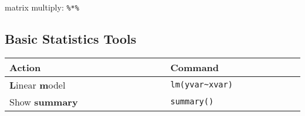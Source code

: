     
    
    




    








    matrix multiply: \lstinline|%*%|



\subsection{Basic Statistics Tools}
\begin{table}[H]
    \centering
    \renewcommand\arraystretch{0.9}
    \begin{tabular}{l|l}
        \hline
        Action$\qquad\qquad\qquad\qquad\qquad\qquad\qquad$&Command$\qquad\qquad\qquad\qquad\qquad$\\
        \hline
        \textbf{L}inear \textbf{m}odel &\lstinline|lm(yvar~xvar)|\\
        Show \textbf{summary} & \lstinline|summary()| 
        \hline
    \end{tabular}
\end{table}

